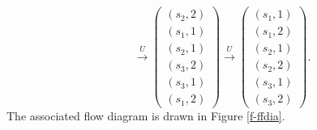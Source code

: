 \documentclass[pra,amsfonts,twocolumn]{revtex4}
\begin{document}
$$\qquad
\stackrel{U}{\longrightarrow }
\left(
\begin{array}{c}
(s_2,2)                \\
(s_1,1)                \\
(s_2,1)                \\
(s_3,2)                \\
(s_3,1)                \\
(s_1,2)
\end{array}
\right)
\stackrel{U}{\longrightarrow }
\left(
\begin{array}{c}
(s_1,1)                \\
(s_1,2)                \\
(s_2,1)                \\
(s_2,2)                \\
(s_3,1)                \\
(s_3,2)
\end{array}
\right).
  $$
The associated flow diagram is drawn in Figure \ref{f-ffdia}.
\end{document}
